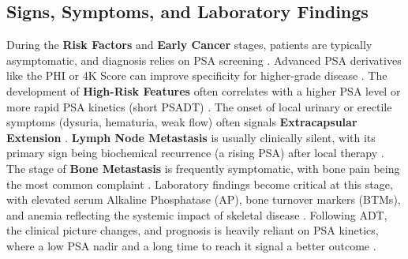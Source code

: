 \documentclass[11pt, a4paper]{article}
\begin{document}
\subsection{Signs, Symptoms, and Laboratory Findings}
During the \textbf{Risk Factors} and \textbf{Early Cancer} stages, patients are typically asymptomatic, and diagnosis relies on PSA screening \cite{PasoglouMichoux2016}. Advanced PSA derivatives like the PHI or 4K Score can improve specificity for higher-grade disease \cite{ChenWang2023}. The development of \textbf{High-Risk Features} often correlates with a higher PSA level or more rapid PSA kinetics (short PSADT) \cite{HesterbergGordetsky2021, Tisman2013}. The onset of local urinary or erectile symptoms (dysuria, hematuria, weak flow) often signals \textbf{Extracapsular Extension} \cite{PasoglouMichoux2016, BalzsAntal2021, HeZhong2024}. \textbf{Lymph Node Metastasis} is usually clinically silent, with its primary sign being biochemical recurrence (a rising PSA) after local therapy \cite{CaglicBarrett2018}. The stage of \textbf{Bone Metastasis} is frequently symptomatic, with bone pain being the most common complaint \cite{UnknownAuthor2014}. Laboratory findings become critical at this stage, with elevated serum Alkaline Phosphatase (AP), bone turnover markers (BTMs), and anemia reflecting the systemic impact of skeletal disease \cite{GoodeWang2023, UnknownAuthor2014}. Following ADT, the clinical picture changes, and prognosis is heavily reliant on PSA kinetics, where a low PSA nadir and a long time to reach it signal a better outcome \cite{BellmuntKheoh2016, OKAHATANO2024, HuMao2023}.
\end{document}
